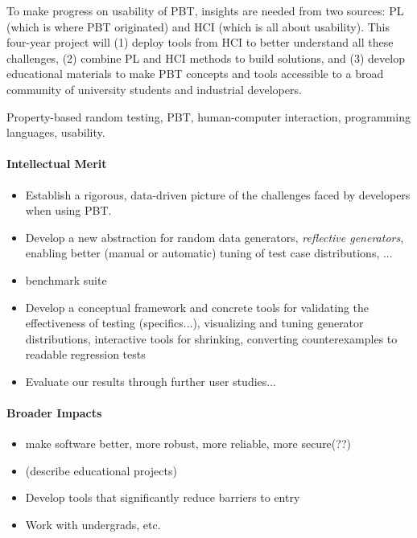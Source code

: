 
To make progress on usability of PBT, insights are needed from two
sources: PL (which is where PBT originated) and HCI (which is all
about usability).
%
This four-year project will (1) deploy tools from HCI to better
understand all these challenges, (2) combine PL and HCI methods to
build solutions, and (3) develop educational materials to make PBT
concepts and tools accessible to a broad community of university
students and industrial developers.

\smallskip

 Property-based random testing, PBT,
human-computer interaction, programming languages, usability.

\paragraph*{Intellectual Merit}
\begin{itemize}
\item Establish a rigorous, data-driven picture of the challenges
faced by developers when using PBT.
\item Develop a new abstraction for random data generators, {\em
  reflective generators}, enabling better (manual or automatic) tuning of test case
distributions, ...
\item benchmark suite
\item Develop a conceptual framework and concrete tools for validating
the effectiveness of testing (specifics...),
visualizing and tuning generator distributions,
interactive tools for shrinking,
converting counterexamples to readable regression tests
\item Evaluate our results through further user studies...
\end{itemize}

\paragraph*{Broader Impacts}
\begin{itemize}
\item make software better, more robust, more reliable, more secure(??)
\item (describe educational projects)
\item Develop tools that significantly reduce barriers to entry
\item Work with undergrads, etc.
\end{itemize}

